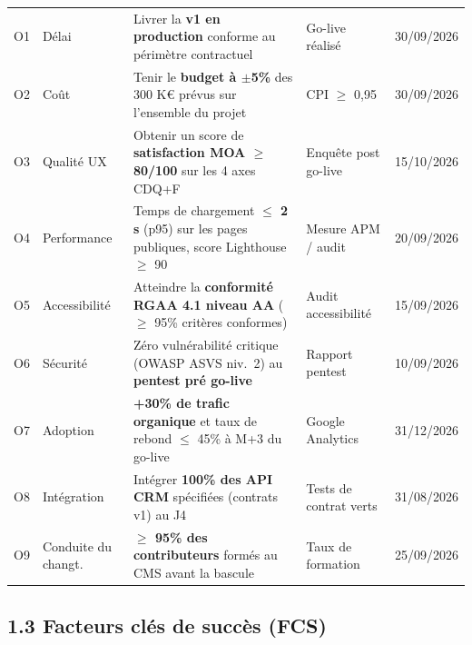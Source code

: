 \documentclass[11pt,a4paper,oneside]{report}
\begin{document}
\renewcommand{\arraystretch}{1.3}
\begin{tabularx}{\textwidth}{C{0.7cm} L{2.6cm} Y C{2.1cm} C{2cm}}
\toprule
{}\th{\#} &  &  &  &  \\
\midrule
O1 & Délai              & Livrer la \textbf{v1 en production} conforme au périmètre contractuel                                               & Go-live réalisé       & 30/09/2026 \\
O2 & Coût               & Tenir le \textbf{budget à $\pm$5\%} des 300 K€ prévus sur l'ensemble du projet                                       & CPI $\geq$ 0,95       & 30/09/2026 \\
O3 & Qualité UX         & Obtenir un score de \textbf{satisfaction MOA $\geq$ 80/100} sur les 4 axes CDQ+F                                      & Enquête post go-live  & 15/10/2026 \\
O4 & Performance        & Temps de chargement \textbf{$\leq$ 2 s} (p95) sur les pages publiques, score Lighthouse $\geq$ 90                      & Mesure APM / audit    & 20/09/2026 \\
O5 & Accessibilité      & Atteindre la \textbf{conformité RGAA 4.1 niveau AA} ($\geq$ 95\% critères conformes)                                 & Audit accessibilité   & 15/09/2026 \\
O6 & Sécurité           & Zéro vulnérabilité critique (OWASP ASVS niv.\ 2) au \textbf{pentest pré go-live}                                      & Rapport pentest       & 10/09/2026 \\
O7 & Adoption           & \textbf{+30\% de trafic organique} et taux de rebond $\leq$ 45\% à M+3 du go-live                                     & Google Analytics      & 31/12/2026 \\
O8 & Intégration        & Intégrer \textbf{100\% des API CRM} spécifiées (contrats v1) au J4                                                   & Tests de contrat verts& 31/08/2026 \\
O9 & Conduite du changt.& \textbf{$\geq$ 95\% des contributeurs} formés au CMS avant la bascule                                                & Taux de formation     & 25/09/2026 \\
\bottomrule
\end{tabularx}

\subsection*{1.3 Facteurs clés de succès (FCS)}
\end{document}
